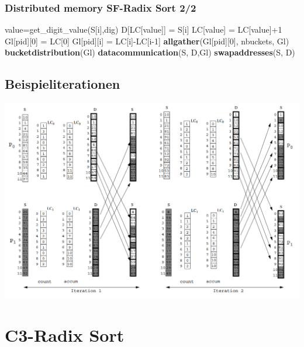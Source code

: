 \documentclass{beamer}
\begin{document}

\begin{frame}
\frametitle{Distributed memory SF-Radix Sort 2/2}
\begin{algorithmic}[1]
		\State value=get\_digit\_value(S[i],dig)
		\State D[LC[value]] = S[i]
		\State LC[value] = LC[value]+1
	\EndFor
	\State Gl[pid][0] = LC[0]
		\State Gl[pid][i] = LC[i]-LC[i-1]
	\EndFor
	\State \textbf{allgather}(Gl[pid][0], nbuckets, Gl)
	\State \textbf{bucketdistribution}(Gl)
	\State \textbf{datacommunication}(S, D,Gl)
	\State \textbf{swapaddresses}(S, D)
\EndFor
\end{algorithmic}
\end{frame}

\subsection{Beispieliterationen}
\begin{frame}
	\includegraphics[width=\textwidth]{SF-RadixIteration.png}
\end{frame}

\section{C3-Radix Sort}
\end{document}
